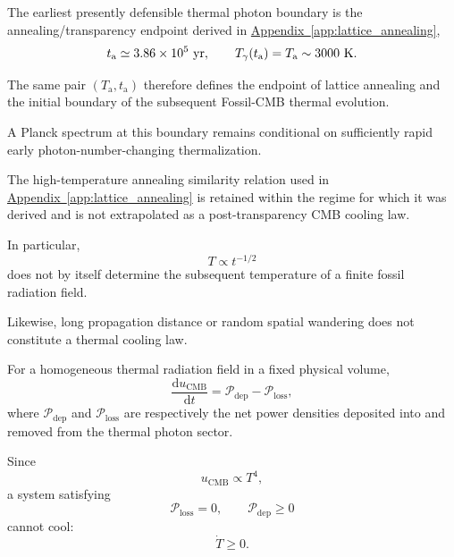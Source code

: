 The earliest presently defensible thermal photon boundary is the
annealing/transparency endpoint derived in
\hyperref[app:lattice_annealing]{Appendix~\ref*{app:lattice_annealing}},
\begin{equation}
    t_{\mathrm a}
    \simeq
    3.86\times10^5~{\rm yr},
    \qquad
    T_{\gamma}(t_{\mathrm a})
    =
    T_{\mathrm a}
    \sim
    3000~{\rm K}.
    \label{eq:AT_transparency_temperature}
\end{equation}

The same pair $(T_{\mathrm a},t_{\mathrm a})$ therefore defines the endpoint
of lattice annealing and the initial boundary of the subsequent Fossil-CMB
thermal evolution.

A Planck spectrum at this boundary remains conditional on sufficiently rapid
early photon-number-changing thermalization.

The high-temperature annealing similarity relation used in
\hyperref[app:lattice_annealing]{Appendix~\ref*{app:lattice_annealing}}
is retained within the regime for which it was derived and is not extrapolated
as a post-transparency CMB cooling law.

In particular,
\begin{equation}
    T\propto t^{-1/2}
\end{equation}
does not by itself determine the subsequent temperature of a finite fossil
radiation field.

Likewise, long propagation distance or random spatial wandering does not
constitute a thermal cooling law.

For a homogeneous thermal radiation field in a fixed physical volume,
\begin{equation}
    \frac{\mathrm d u_{\mathrm{CMB}}}{\mathrm dt}
    =
    \mathcal P_{\mathrm{dep}}
    -
    \mathcal P_{\mathrm{loss}},
    \label{eq:AT_fossil_first_law}
\end{equation}
where
$\mathcal P_{\mathrm{dep}}$
and
$\mathcal P_{\mathrm{loss}}$
are respectively the net power densities deposited into and removed from the
thermal photon sector.

Since
\begin{equation}
    u_{\mathrm{CMB}}\propto T^4,
\end{equation}
a system satisfying
\begin{equation}
    \mathcal P_{\mathrm{loss}}=0,
    \qquad
    \mathcal P_{\mathrm{dep}}\geq0
\end{equation}
cannot cool:
\begin{equation}
    \dot T\geq0.
    \label{eq:AT_no_loss_no_cooling}
\end{equation}


